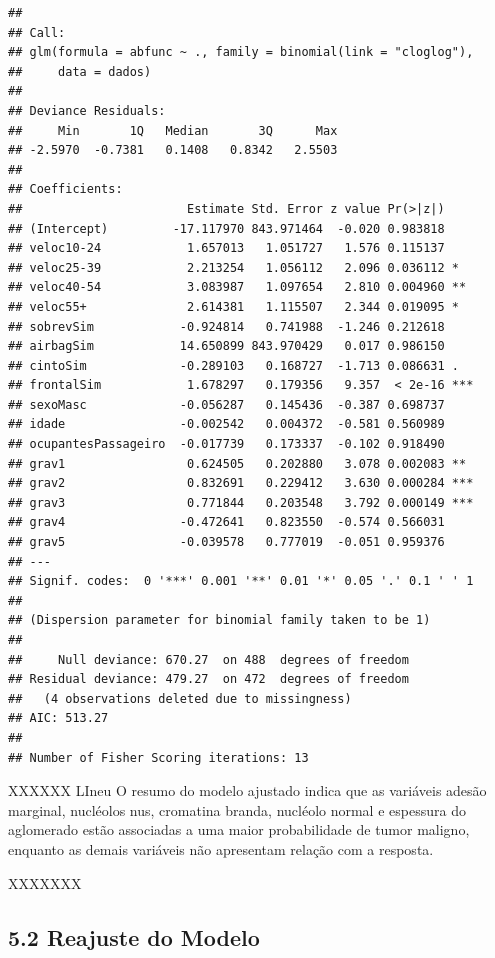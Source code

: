 \documentclass[]{article}
\begin{document}
\begin{verbatim}
## 
## Call:
## glm(formula = abfunc ~ ., family = binomial(link = "cloglog"), 
##     data = dados)
## 
## Deviance Residuals: 
##     Min       1Q   Median       3Q      Max  
## -2.5970  -0.7381   0.1408   0.8342   2.5503  
## 
## Coefficients:
##                       Estimate Std. Error z value Pr(>|z|)    
## (Intercept)         -17.117970 843.971464  -0.020 0.983818    
## veloc10-24            1.657013   1.051727   1.576 0.115137    
## veloc25-39            2.213254   1.056112   2.096 0.036112 *  
## veloc40-54            3.083987   1.097654   2.810 0.004960 ** 
## veloc55+              2.614381   1.115507   2.344 0.019095 *  
## sobrevSim            -0.924814   0.741988  -1.246 0.212618    
## airbagSim            14.650899 843.970429   0.017 0.986150    
## cintoSim             -0.289103   0.168727  -1.713 0.086631 .  
## frontalSim            1.678297   0.179356   9.357  < 2e-16 ***
## sexoMasc             -0.056287   0.145436  -0.387 0.698737    
## idade                -0.002542   0.004372  -0.581 0.560989    
## ocupantesPassageiro  -0.017739   0.173337  -0.102 0.918490    
## grav1                 0.624505   0.202880   3.078 0.002083 ** 
## grav2                 0.832691   0.229412   3.630 0.000284 ***
## grav3                 0.771844   0.203548   3.792 0.000149 ***
## grav4                -0.472641   0.823550  -0.574 0.566031    
## grav5                -0.039578   0.777019  -0.051 0.959376    
## ---
## Signif. codes:  0 '***' 0.001 '**' 0.01 '*' 0.05 '.' 0.1 ' ' 1
## 
## (Dispersion parameter for binomial family taken to be 1)
## 
##     Null deviance: 670.27  on 488  degrees of freedom
## Residual deviance: 479.27  on 472  degrees of freedom
##   (4 observations deleted due to missingness)
## AIC: 513.27
## 
## Number of Fisher Scoring iterations: 13
\end{verbatim}

XXXXXX LIneu O resumo do modelo ajustado indica que as variáveis adesão
marginal, nucléolos nus, cromatina branda, nucléolo normal e espessura
do aglomerado estão associadas a uma maior probabilidade de tumor
maligno, enquanto as demais variáveis não apresentam relação com a
resposta.

XXXXXXX

\subsection{\texorpdfstring{\textbf{5.2 Reajuste do
Modelo}}{5.2 Reajuste do Modelo}}\label{reajuste-do-modelo}
\end{document}

